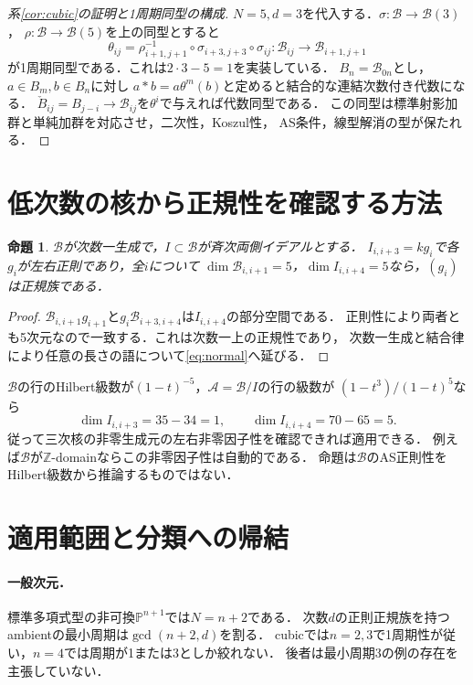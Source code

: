 \documentclass[10pt,a4paper]{ltjsarticle}
\newtheorem{proposition}[theorem]{命題}
\newcommand{\Z}{\mathbb Z}
\newcommand{\cB}{\mathcal B}
\newcommand{\cA}{\mathcal A}
\begin{document}
\begin{proof}[系\ref{cor:cubic}の証明と1周期同型の構成]
$N=5,d=3$を代入する．$\sigma:\cB\to\cB(3)$，
$\rho:\cB\to\cB(5)$を上の同型とすると
\begin{equation}\label{eq:one}
 \theta_{ij}
 =\rho_{i+1,j+1}^{-1}\circ\sigma_{i+3,j+3}\circ\sigma_{ij}
 :\cB_{ij}\longrightarrow\cB_{i+1,j+1}
\end{equation}
が1周期同型である．これは$2\cdot3-5=1$を実装している．
$B_n=\cB_{0n}$とし，$a\in B_m,b\in B_n$に対し
$a*b=a\theta^m(b)$と定めると結合的な連結次数付き代数になる．
$\check B_{ij}=B_{j-i}\to\cB_{ij}$を$\theta^i$で与えれば代数同型である．
この同型は標準射影加群と単純加群を対応させ，二次性，Koszul性，
AS条件，線型解消の型が保たれる．
\end{proof}

\section{低次数の核から正規性を確認する方法}
\begin{proposition}\label{prop:low}
$\cB$が次数一生成で，$I\subset\cB$が斉次両側イデアルとする．
$I_{i,i+3}=kg_i$で各$g_i$が左右正則であり，全$i$について
$\dim\cB_{i,i+1}=5$，$\dim I_{i,i+4}=5$なら，$(g_i)$は正規族である．
\end{proposition}
\begin{proof}
$\cB_{i,i+1}g_{i+1}$と$g_i\cB_{i+3,i+4}$は$I_{i,i+4}$の部分空間である．
正則性により両者とも5次元なので一致する．これは次数一上の正規性であり，
次数一生成と結合律により任意の長さの語について\eqref{eq:normal}へ延びる．
\end{proof}

$\cB$の行のHilbert級数が$(1-t)^{-5}$，$\cA=\cB/I$の行の級数が
$(1-t^3)/(1-t)^5$なら
\[
 \dim I_{i,i+3}=35-34=1,\qquad\dim I_{i,i+4}=70-65=5.
\]
従って三次核の非零生成元の左右非零因子性を確認できれば適用できる．
例えば$\cB$が$\Z$-domainならこの非零因子性は自動的である．
命題は$\cB$のAS正則性をHilbert級数から推論するものではない．

\section{適用範囲と分類への帰結}
\paragraph{一般次元．}
標準多項式型の非可換$\mathbb P^{n+1}$では$N=n+2$である．
次数$d$の正則正規族を持つambientの最小周期は$\gcd(n+2,d)$を割る．
cubicでは$n=2,3$で1周期性が従い，$n=4$では周期が1または3としか絞れない．
後者は最小周期3の例の存在を主張していない．
\end{document}
